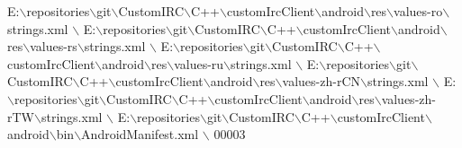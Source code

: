 \begin{DoxyCode}
E:\(\backslash\)repositories\(\backslash\)git\(\backslash\)CustomIRC\(\backslash\)C++\(\backslash\)customIrcClient\(\backslash\)android\(\backslash\)res\(\backslash\)values-ro\(\backslash\)strings.xml \(\backslash\)
E:\(\backslash\)repositories\(\backslash\)git\(\backslash\)CustomIRC\(\backslash\)C++\(\backslash\)customIrcClient\(\backslash\)android\(\backslash\)res\(\backslash\)values-rs\(\backslash\)strings.xml \(\backslash\)
E:\(\backslash\)repositories\(\backslash\)git\(\backslash\)CustomIRC\(\backslash\)C++\(\backslash\)customIrcClient\(\backslash\)android\(\backslash\)res\(\backslash\)values-ru\(\backslash\)strings.xml \(\backslash\)
E:\(\backslash\)repositories\(\backslash\)git\(\backslash\)CustomIRC\(\backslash\)C++\(\backslash\)customIrcClient\(\backslash\)android\(\backslash\)res\(\backslash\)values-zh-rCN\(\backslash\)strings.xml \(\backslash\)
E:\(\backslash\)repositories\(\backslash\)git\(\backslash\)CustomIRC\(\backslash\)C++\(\backslash\)customIrcClient\(\backslash\)android\(\backslash\)res\(\backslash\)values-zh-rTW\(\backslash\)strings.xml \(\backslash\)
E:\(\backslash\)repositories\(\backslash\)git\(\backslash\)CustomIRC\(\backslash\)C++\(\backslash\)customIrcClient\(\backslash\)android\(\backslash\)bin\(\backslash\)AndroidManifest.xml \(\backslash\)
00003 \end{DoxyCode}
